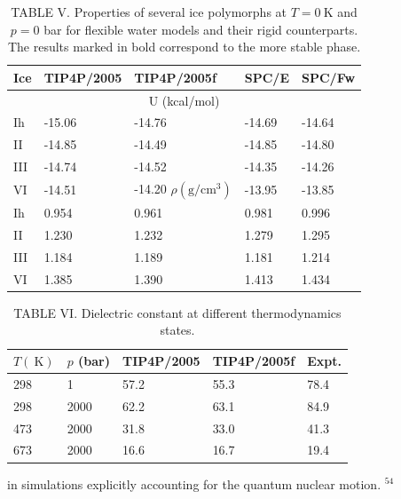 \documentclass[10pt]{article}
\begin{document}
\begin{table}[h]
\begin{center}
\captionsetup{labelformat=empty}
\caption{TABLE V. Properties of several ice polymorphs at $T=0 \mathrm{~K}$ and $p=0$ bar for flexible water models and their rigid counterparts. The results marked in bold correspond to the more stable phase.}
\begin{tabular}{|l|l|l|l|l|}
\hline
Ice & TIP4P/2005 & TIP4P/2005f & SPC/E & SPC/Fw \\
\hline
\multicolumn{5}{|c|}{U (kcal/mol)} \\
\hline
Ih & -15.06 & -14.76 & -14.69 & -14.64 \\
\hline
II & -14.85 & -14.49 & -14.85 & -14.80 \\
\hline
III & -14.74 & -14.52 & -14.35 & -14.26 \\
\hline
VI & -14.51 & -14.20 $\rho\left(\mathrm{g} / \mathrm{cm}^{3}\right)$ & -13.95 & -13.85 \\
\hline
Ih & 0.954 & 0.961 & 0.981 & 0.996 \\
\hline
II & 1.230 & 1.232 & 1.279 & 1.295 \\
\hline
III & 1.184 & 1.189 & 1.181 & 1.214 \\
\hline
VI & 1.385 & 1.390 & 1.413 & 1.434 \\
\hline
\end{tabular}
\end{center}
\end{table}

\begin{table}[h]
\begin{center}
\captionsetup{labelformat=empty}
\caption{TABLE VI. Dielectric constant at different thermodynamics states.}
\begin{tabular}{|l|l|l|l|l|}
\hline
$T(\mathrm{~K})$ & $p$ (bar) & TIP4P/2005 & TIP4P/2005f & Expt. \\
\hline
298 & 1 & 57.2 & 55.3 & 78.4 \\
\hline
298 & 2000 & 62.2 & 63.1 & 84.9 \\
\hline
473 & 2000 & 31.8 & 33.0 & 41.3 \\
\hline
673 & 2000 & 16.6 & 16.7 & 19.4 \\
\hline
\end{tabular}
\end{center}
\end{table}

in simulations explicitly accounting for the quantum nuclear motion. ${ }^{54}$
\end{document}
